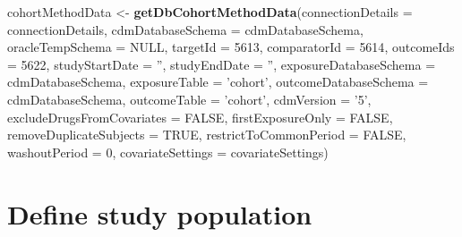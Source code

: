 \documentclass[]{article}
\newenvironment{Shaded}{\begin{snugshade}}{\end{snugshade}}
\newcommand{\DataTypeTok}[1]{\textcolor[rgb]{0.13,0.29,0.53}{#1}}
\newcommand{\DecValTok}[1]{\textcolor[rgb]{0.00,0.00,0.81}{#1}}
\newcommand{\KeywordTok}[1]{\textcolor[rgb]{0.13,0.29,0.53}{\textbf{#1}}}
\newcommand{\NormalTok}[1]{#1}
\newcommand{\OtherTok}[1]{\textcolor[rgb]{0.56,0.35,0.01}{#1}}
\newcommand{\StringTok}[1]{\textcolor[rgb]{0.31,0.60,0.02}{#1}}
\begin{document}
\begin{Shaded}
\begin{Highlighting}[]
\NormalTok{cohortMethodData <-}\StringTok{ }
\StringTok{  }\KeywordTok{getDbCohortMethodData}\NormalTok{(}\DataTypeTok{connectionDetails =}\NormalTok{ connectionDetails,}
                        \DataTypeTok{cdmDatabaseSchema =}\NormalTok{ cdmDatabaseSchema,}
                        \DataTypeTok{oracleTempSchema =} \OtherTok{NULL}\NormalTok{,}
                        \DataTypeTok{targetId =} \DecValTok{5613}\NormalTok{,}
                        \DataTypeTok{comparatorId =} \DecValTok{5614}\NormalTok{,}
                        \DataTypeTok{outcomeIds =} \DecValTok{5622}\NormalTok{,  }
                        \DataTypeTok{studyStartDate =} \StringTok{''}\NormalTok{,}
                        \DataTypeTok{studyEndDate =} \StringTok{''}\NormalTok{,}
                        \DataTypeTok{exposureDatabaseSchema =}\NormalTok{ cdmDatabaseSchema,}
                        \DataTypeTok{exposureTable =} \StringTok{'cohort'}\NormalTok{,}
                        \DataTypeTok{outcomeDatabaseSchema =}\NormalTok{ cdmDatabaseSchema,}
                        \DataTypeTok{outcomeTable =} \StringTok{'cohort'}\NormalTok{,}
                        \DataTypeTok{cdmVersion =} \StringTok{'5'}\NormalTok{,}
                        \DataTypeTok{excludeDrugsFromCovariates =} \OtherTok{FALSE}\NormalTok{,}
                        \DataTypeTok{firstExposureOnly =} \OtherTok{FALSE}\NormalTok{,}
                        \DataTypeTok{removeDuplicateSubjects =} \OtherTok{TRUE}\NormalTok{,}
                        \DataTypeTok{restrictToCommonPeriod =} \OtherTok{FALSE}\NormalTok{,}
                        \DataTypeTok{washoutPeriod =} \DecValTok{0}\NormalTok{,}
                        \DataTypeTok{covariateSettings =}\NormalTok{ covariateSettings)}
\end{Highlighting}
\end{Shaded}

\hypertarget{define-study-population}{%
\section{Define study population}\label{define-study-population}}
\end{document}
